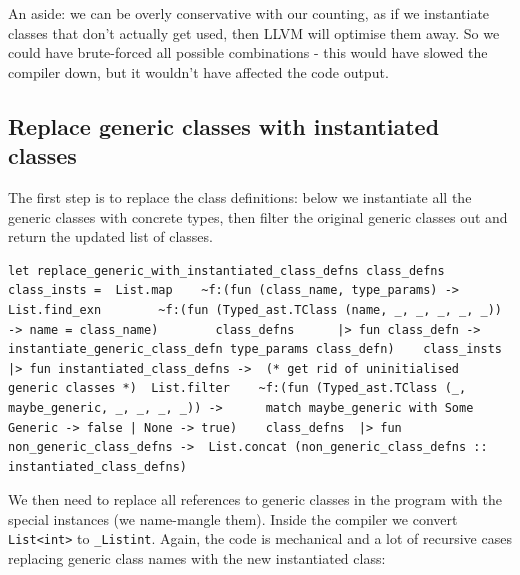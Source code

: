 An aside: we can be overly conservative with our counting, as if we
instantiate classes that don't actually get used, then LLVM will
optimise them away. So we could have brute-forced all possible
combinations - this would have slowed the compiler down, but it wouldn't
have affected the code output.

\hypertarget{replace-generic-classes-with-instantiated-classes}{%
\subsection{\texorpdfstring{\protect\hyperlink{replace-generic-classes-with-instantiated-classes}{}Replace
generic classes with instantiated
classes}{Replace generic classes with instantiated classes}}\label{replace-generic-classes-with-instantiated-classes}}

The first step is to replace the class definitions: below we instantiate
all the generic classes with concrete types, then filter the original
generic classes out and return the updated list of classes.

%

\begin{lstlisting}[caption={replace\_generic\_with\_instantiated\_class\_defns.ml},language=caml]
let replace_generic_with_instantiated_class_defns class_defns class_insts =  List.map    ~f:(fun (class_name, type_params) ->      List.find_exn        ~f:(fun (Typed_ast.TClass (name, _, _, _, _, _)) -> name = class_name)        class_defns      |> fun class_defn -> instantiate_generic_class_defn type_params class_defn)    class_insts  |> fun instantiated_class_defns ->  (* get rid of uninitialised generic classes *)  List.filter    ~f:(fun (Typed_ast.TClass (_, maybe_generic, _, _, _, _)) ->      match maybe_generic with Some Generic -> false | None -> true)    class_defns  |> fun non_generic_class_defns ->  List.concat (non_generic_class_defns :: instantiated_class_defns)
\end{lstlisting}

We then need to replace all references to generic classes in the program
with the special instances (we name-mangle them). Inside the compiler we
convert \texttt{List\textless{}int\textgreater{}} to \texttt{\_Listint}.
Again, the code is mechanical and a lot of recursive cases replacing
generic class names with the new instantiated class:


